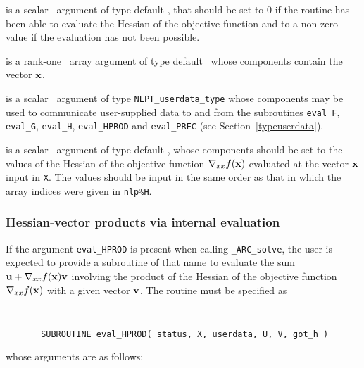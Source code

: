 \documentclass{galahad}
\newcommand{\packagename}{ARC}
\newcommand{\fullpackagename}{\libraryname\_\packagename}
\newcommand{\solver}{{\tt \fullpackagename\_solve}}
\begin{document}
\begin{description}
 is a scalar \intentout\ argument of type default \integer,
that should be set to 0 if the routine has been able to evaluate
the Hessian of the objective function
and to a non-zero value if the evaluation has not been possible.

 is a rank-one \intentin\ array argument of type default \realdp\
whose components contain the vector ${\mathbf{x}}$.

 is a scalar \intentinout\ argument of type
{\tt NLPT\_userdata\_type} whose components may be used
to communicate user-supplied data to and from the
subroutines {\tt eval\_F}, {\tt eval\_G},
{\tt eval\_H}, {\tt eval\_HPROD} and {\tt eval\_PREC}
(see Section~\ref{typeuserdata}).

 is a scalar \intentout\ argument of type default \realdp,
whose components should be set to the values of the Hessian
of the objective function $\nabla_{xx} f({\mathbf{x}})$
evaluated at the vector ${\mathbf{x}}$ input in {\tt X}. The values should
be input in the same order as that in which the array indices were
given in {\tt nlp\%H}.

\end{description}


\subsubsection{Hessian-vector products via internal evaluation\label{hvfv}}

If the argument {\tt eval\_HPROD} is present when calling \solver, the
user is expected to provide a subroutine of that name to evaluate the
sum ${\mathbf{u}} + \nabla_{xx} f({\mathbf{x}}) {\mathbf{v}}$ involving the
product of the Hessian of the objective function $\nabla_{xx} f({\mathbf{x}})$
with a given vector ${\mathbf{v}}$.
The routine must be specified as

\def\baselinestretch{0.8}
{\tt
\begin{verbatim}
       SUBROUTINE eval_HPROD( status, X, userdata, U, V, got_h )
\end{verbatim} }
\def\baselinestretch{1.0}
\noindent whose arguments are as follows:
\end{document}
